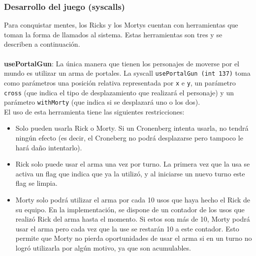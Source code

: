 \documentclass[a4paper]{article}
\begin{document}
\subsubsection{Desarrollo del juego (syscalls)}
Para conquistar mentes, los Ricks y los Mortys cuentan con herramientas que toman la forma de llamados al sistema. Estas herramientas son tres y se describen a continuación.
\\
\\
\textbf{usePortalGun}:
La única manera que tienen los personajes de moverse por el mundo es utilizar un arma de portales. La syscall {\tt usePortalGun (int 137)} toma como parámetros una posición relativa representada por {\tt x} e {\tt y}, un parámetro {\tt cross} (que indica el tipo de desplazamiento que realizará el personaje) y un parámetro {\tt withMorty} (que indica si se desplazará uno o los dos). \\
El uso de esta herramienta tiene las siguientes restricciones:
\begin{itemize}
\item Solo pueden usarla Rick o Morty. Si un Cronenberg intenta usarla, no tendrá ningún efecto (es decir, el Croneberg no podrá desplazarse pero tampoco le hará daño intentarlo).
\item Rick solo puede usar el arma una vez por turno. La primera vez que la usa se activa un flag que indica que ya la utilizó, y al iniciarse un nuevo turno este flag se limpia.
\item Morty solo podrá utilizar el arma por cada 10 usos que haya hecho el Rick de su equipo. En la implementación, se dispone de un contador de los usos que realizó Rick del arma hasta el momento. Si estos son más de 10, Morty podrá usar el arma pero cada vez que la use se restarán 10 a este contador. Esto permite que Morty no pierda oportunidades de usar el arma si en un turno no logró utilizarla por algún motivo, ya que son acumulables.
\end{itemize}
\end{document}
